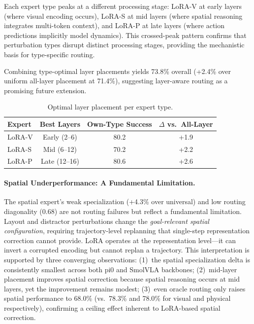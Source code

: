 \documentclass[letterpaper]{article}
\begin{document}
Each expert type peaks at a different processing stage: LoRA-V at early layers (where visual encoding occurs), LoRA-S at mid layers (where spatial reasoning integrates multi-token context), and LoRA-P at late layers (where action predictions implicitly model dynamics).
This crossed-peak pattern confirms that perturbation types disrupt distinct processing stages, providing the mechanistic basis for type-specific routing.

Combining type-optimal layer placements yields 73.8\% overall (+2.4\% over uniform all-layer placement at 71.4\%), suggesting layer-aware routing as a promising future extension.

\begin{table}[h]
\centering
\caption{Optimal layer placement per expert type.}
\label{tab:layer-optimal}
\small
\begin{tabular}{lccc}
\toprule
Expert & Best Layers & Own-Type Success & $\Delta$ vs.\ All-Layer \\
\midrule
LoRA-V & Early (2--6) & 80.2 & +1.9 \\
LoRA-S & Mid (6--12) & 70.2 & +2.2 \\
LoRA-P & Late (12--16) & 80.6 & +2.6 \\
\bottomrule
\end{tabular}
\end{table}

\paragraph{Spatial Underperformance: A Fundamental Limitation.}
The spatial expert's weak specialization (+4.3\% over universal) and low routing diagonality (0.68) are not routing failures but reflect a fundamental limitation.
Layout and distractor perturbations change the \emph{goal-relevant spatial configuration}, requiring trajectory-level replanning that single-step representation correction cannot provide.
LoRA operates at the representation level---it can invert a corrupted encoding but cannot replan a trajectory.
This interpretation is supported by three converging observations:
(1)~the spatial specialization delta is consistently smallest across both pi0 and SmolVLA backbones;
(2)~mid-layer placement improves spatial correction because spatial reasoning occurs at mid layers, yet the improvement remains modest;
(3)~even oracle routing only raises spatial performance to 68.0\% (vs.\ 78.3\% and 78.0\% for visual and physical respectively), confirming a ceiling effect inherent to LoRA-based spatial correction.
\end{document}
